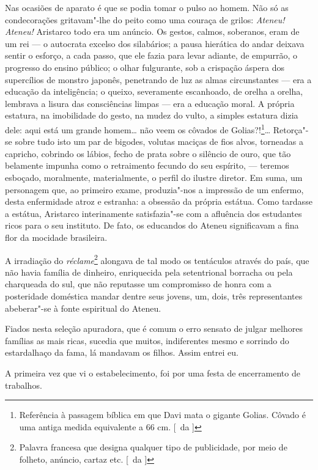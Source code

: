 Nas ocasiões de aparato é que se podia tomar o pulso ao homem. 
Não só as condecorações
gritavam"-lhe do peito como uma couraça de grilos: \textit{Ateneu!} \textit{Ateneu!}
Aristarco todo era um anúncio. Os gestos, calmos, soberanos, eram de um
rei --- o autocrata excelso dos silabários; a pausa hierática do andar
deixava sentir o esforço, a cada passo, que ele fazia para levar
adiante, de empurrão, o progresso do ensino público; o olhar
fulgurante, sob a crispação áspera dos supercílios de monstro japonês,
penetrando de luz as almas circunstantes --- era a educação da
inteligência; o queixo, severamente escanhoado, de orelha a orelha,
lembrava a lisura das consciências limpas --- era a educação moral. A
própria estatura, na imobilidade do gesto, na mudez do vulto, a simples
estatura dizia dele: aqui está um grande homem\ldots{} não veem os 
côvados de Golias?!\footnote{ Referência à passagem bíblica em que Davi mata o gigante Golias. 
Côvado é uma antiga medida equivalente a 66 cm. [~da ]}\ldots{} 
Retorça"-se sobre tudo isto um par de 
bigodes, volutas maciças de fios alvos, torneadas a capricho, cobrindo os lábios, fecho
de prata sobre o silêncio de ouro, que tão belamente impunha como o
retraimento fecundo do seu espírito, --- teremos esboçado, moralmente,
materialmente, o perfil do ilustre diretor. Em suma, um personagem que,
ao primeiro exame, produzia"-nos a impressão de um enfermo, desta
enfermidade atroz e estranha: a obsessão da própria estátua. Como
tardasse a estátua, Aristarco interinamente satisfazia"-se com a
afluência dos estudantes ricos para o seu instituto. De fato, os
educandos do Ateneu significavam a fina flor da mocidade brasileira. 

A irradiação do \textit{réclame}\footnote{ Palavra francesa que designa 
qualquer tipo de publicidade, por meio de folheto, anúncio, cartaz etc. 
[~da ]} alongava de tal modo os tentáculos através do
país, que não havia família de dinheiro, enriquecida pela setentrional
borracha ou pela charqueada do sul, que não reputasse um compromisso de
honra com a posteridade doméstica mandar dentre seus jovens, um, dois,
três representantes abeberar"-se à fonte espiritual do Ateneu. 

Fiados nesta seleção apuradora, que é comum o erro sensato de julgar melhores
famílias as mais ricas, sucedia que muitos, indiferentes mesmo e
sorrindo do estardalhaço da fama, lá mandavam os filhos. Assim entrei eu. 

A primeira vez que vi o estabelecimento, foi por uma festa de
encerramento de trabalhos. 

